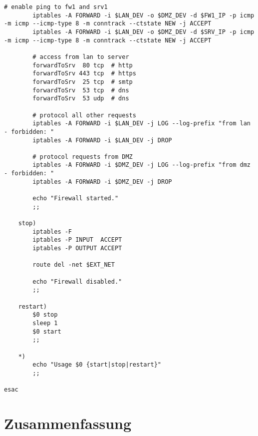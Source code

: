 \begin{lstlisting}[label=lst:masq,caption={Basisskript interne Firewall.}]
        # enable ping to fw1 and srv1
        iptables -A FORWARD -i $LAN_DEV -o $DMZ_DEV -d $FW1_IP -p icmp -m icmp --icmp-type 8 -m conntrack --ctstate NEW -j ACCEPT
        iptables -A FORWARD -i $LAN_DEV -o $DMZ_DEV -d $SRV_IP -p icmp -m icmp --icmp-type 8 -m conntrack --ctstate NEW -j ACCEPT

        # access from lan to server
        forwardToSrv  80 tcp  # http
        forwardToSrv 443 tcp  # https
        forwardToSrv  25 tcp  # smtp
        forwardToSrv  53 tcp  # dns
        forwardToSrv  53 udp  # dns

        # protocol all other requests
        iptables -A FORWARD -i $LAN_DEV -j LOG --log-prefix "from lan - forbidden: "
        iptables -A FORWARD -i $LAN_DEV -j DROP

        # protocol requests from DMZ
        iptables -A FORWARD -i $DMZ_DEV -j LOG --log-prefix "from dmz - forbidden: "
        iptables -A FORWARD -i $DMZ_DEV -j DROP

        echo "Firewall started."
        ;;

    stop)
        iptables -F
        iptables -P INPUT  ACCEPT
        iptables -P OUTPUT ACCEPT

        route del -net $EXT_NET

        echo "Firewall disabled."
        ;;

    restart)
        $0 stop
        sleep 1
        $0 start
        ;;

    *)
        echo "Usage $0 {start|stop|restart}"
        ;;

esac
\end{lstlisting}
\section{Zusammenfassung}



\begin{appendix}
\section{\fwa}


%
\end{appendix}
